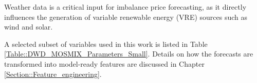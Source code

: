 \documentclass[class=scrbook, crop=false]{standalone}
\begin{document}
Weather data is a critical input for imbalance price forecasting, as it directly influences the generation of variable renewable energy (VRE) sources such as wind and solar.

A selected subset of variables used in this work is listed in Table \ref{Table::DWD_MOSMIX_Parameters_Small}. Details on how the forecasts are transformed into model-ready features are discussed in Chapter \ref{Section::Feature_engineering}.




\end{document}
